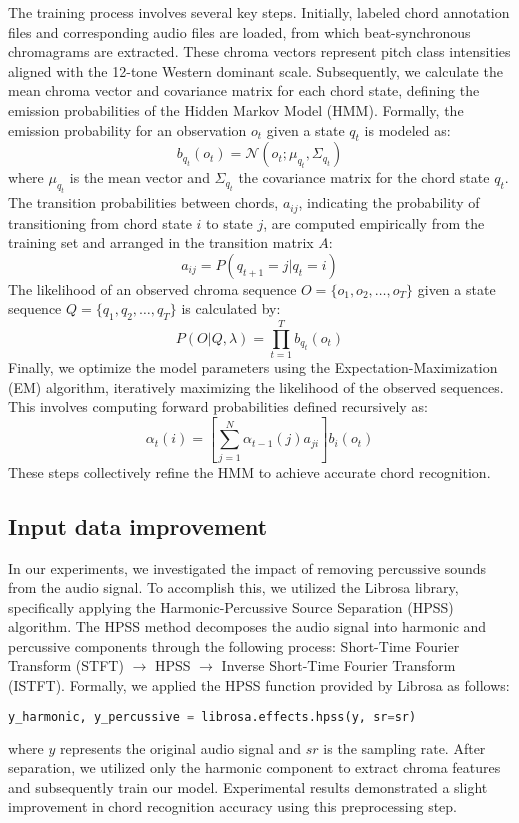 \documentclass{article}
\begin{document}
The training process involves several key steps. Initially, labeled chord annotation files and corresponding audio files are loaded, from which beat-synchronous chromagrams are extracted. These chroma vectors represent pitch class intensities aligned with the 12-tone Western dominant scale. Subsequently, we calculate the mean chroma vector and covariance matrix for each chord state, defining the emission probabilities of the Hidden Markov Model (HMM). Formally, the emission probability for an observation $o_t$ given a state $q_t$ is modeled as:
\begin{equation}
b_{q_t}(o_t) = \mathcal{N}(o_t;\mu_{q_t}, \Sigma_{q_t})
\end{equation}
where $\mu_{q_t}$ is the mean vector and $\Sigma_{q_t}$ the covariance matrix for the chord state $q_t$. The transition probabilities between chords, $a_{ij}$, indicating the probability of transitioning from chord state $i$ to state $j$, are computed empirically from the training set and arranged in the transition matrix $A$:
\begin{equation}
a_{ij} = P(q_{t+1}=j|q_t=i)
\end{equation}
The likelihood of an observed chroma sequence $O = \{o_1, o_2, \dots, o_T\}$ given a state sequence $Q = \{q_1, q_2, \dots, q_T\}$ is calculated by:
\begin{equation}
P(O|Q,\lambda) = \prod_{t=1}^{T} b_{q_t}(o_t)
\end{equation}
Finally, we optimize the model parameters using the Expectation-Maximization (EM) algorithm, iteratively maximizing the likelihood of the observed sequences. This involves computing forward probabilities defined recursively as:
\begin{equation}
\alpha_t(i) = \left[\sum_{j=1}^{N}\alpha_{t-1}(j)a_{ji}\right] b_i(o_t)
\end{equation}
These steps collectively refine the HMM to achieve accurate chord recognition.

\subsection{Input data improvement}
In our experiments, we investigated the impact of removing percussive sounds from the audio signal. To accomplish this, we utilized the Librosa library, specifically applying the Harmonic-Percussive Source Separation (HPSS) algorithm. The HPSS method decomposes the audio signal into harmonic and percussive components through the following process: Short-Time Fourier Transform (STFT) $\rightarrow$ HPSS $\rightarrow$ Inverse Short-Time Fourier Transform (ISTFT). Formally, we applied the HPSS function provided by Librosa as follows:
\begin{lstlisting}[language=Python]
y_harmonic, y_percussive = librosa.effects.hpss(y, sr=sr)
\end{lstlisting}
where $y$ represents the original audio signal and $sr$ is the sampling rate. After separation,
we utilized only the harmonic component to extract chroma features and subsequently train our model.
Experimental results demonstrated a slight improvement in chord recognition accuracy using this preprocessing step.
\end{document}

